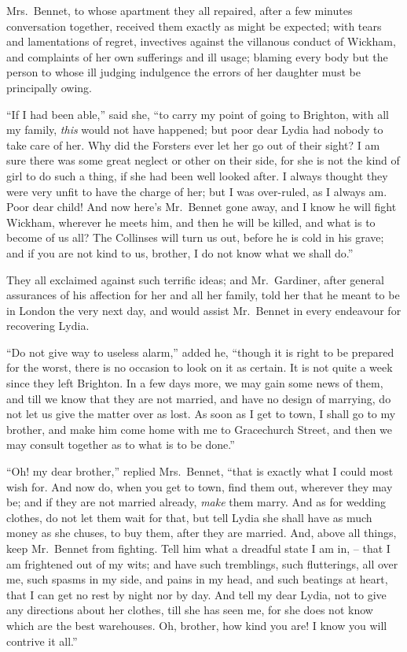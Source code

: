 Mrs.\ Bennet, to whose apartment they all repaired,
after a few minutes conversation together, received them
exactly as might be expected; with tears and lamentations
of regret, invectives against the villanous conduct
of Wickham, and complaints of her own sufferings and
ill usage; blaming every body but the person to whose
ill judging indulgence the errors of her daughter must be
principally owing.

“If I had been able,” said she, “to carry my point of
going to Brighton, with all my family, \textit{this} would not
have happened; but poor dear Lydia had nobody to
take care of her. Why did the Forsters ever let her go
out of their sight? I am sure there was some great
neglect or other on their side, for she is not the kind of
girl to do such a thing, if she had been well looked after.
I always thought they were very unfit to have the charge
of her; but I was over-ruled, as I always am. Poor
dear child! And now here’s Mr.\ Bennet gone away, and
I know he will fight Wickham, wherever he meets him,
and then he will be killed, and what is to become of us all?
The Collinses will turn us out, before he is cold in his
grave; and if you are not kind to us, brother, I do not
know what we shall do.”

They all exclaimed against such terrific ideas; and
Mr.\ Gardiner, after general assurances of his affection for
her and all her family, told her that he meant to be in
London the very next day, and would assist Mr.\ Bennet
in every endeavour for recovering Lydia.

“Do not give way to useless alarm,” added he, “though
it is right to be prepared for the worst, there is no occasion
to look on it as certain. It is not quite a week since they
left Brighton. In a few days more, we may gain some
news of them, and till we know that they are not married,
and have no design of marrying, do not let us give the
matter over as lost. As soon as I get to town, I shall
go to my brother, and make him come home with me to
Gracechurch Street, and then we may consult together as
to what is to be done.”

“Oh! my dear brother,” replied Mrs.\ Bennet, “that
is exactly what I could most wish for. And now do,
when you get to town, find them out, wherever they may
be; and if they are not married already, \textit{make} them
marry. And as for wedding clothes, do not let them wait
for that, but tell Lydia she shall have as much money
as she chuses, to buy them, after they are married. And,
above all things, keep Mr.\ Bennet from fighting. Tell
him what a dreadful state I am in, -- that I am frightened
out of my wits; and have such tremblings, such flutterings,
all over me, such spasms in my side, and pains in
my head, and such beatings at heart, that I can get no
rest by night nor by day. And tell my dear Lydia, not
to give any directions about her clothes, till she has seen
me, for she does not know which are the best warehouses.
Oh, brother, how kind you are! I know you will contrive
it all.”

